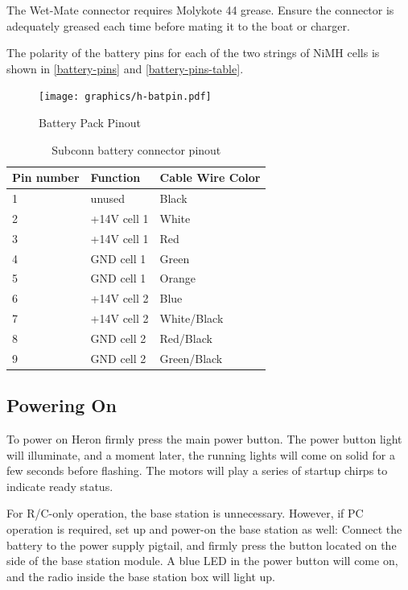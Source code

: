 \documentclass[]{clearpath-latex/clearpath-manual}
\begin{document}
\begin{warning}
The Wet-Mate connector requires Molykote 44 grease. Ensure the connector is adequately greased each time before mating it to the boat or charger.
\end{warning}


The polarity of the battery pins for each of the two strings of NiMH cells is shown in \autoref{battery-pins} and \autoref{battery-pins-table}.

\begin{figure}[h]
  \centering
  \texttt{[image: graphics/h-batpin.pdf]}
  \caption{Battery Pack Pinout}
  \label{battery-pins}
\end{figure}

\begin{table}[h]
\centering
\label{chg_pinout}
\begin{tabular}{|l|l|l|}
Pin number  & Function & Cable Wire Color \\
\hline
1  & unused & Black         \\ \hline
2  & +14V cell 1 & White  	\\ \hline
3  & +14V cell 1 & Red		\\ \hline
4  & GND cell 1 & Green     \\ \hline
5  & GND cell 1 & Orange    \\ \hline
6  & +14V cell 2 & Blue     \\ \hline
7  & +14V cell 2 & White/Black	\\ \hline
8  & GND cell 2 & Red/Black		\\ \hline
9  & GND cell 2 & Green/Black	\\ \hline

\end{tabular}
\label{battery-pins-table}
\caption{Subconn battery connector pinout}
\end{table}

\newpage

\subsection{Powering On}
To power on Heron firmly press the main power button. The power button light will illuminate, and a moment later, the running lights will come on solid for a few seconds before flashing. The motors will play a series of startup chirps to indicate ready status.

For R/C-only operation, the base station is unnecessary. However, if PC operation is required, set up and power-on the base station as well: Connect the battery to the power supply pigtail, and firmly press the button located on the side of the base station module. A blue LED in the power button will come on, and the radio inside the base station box will light up.
\end{document}
